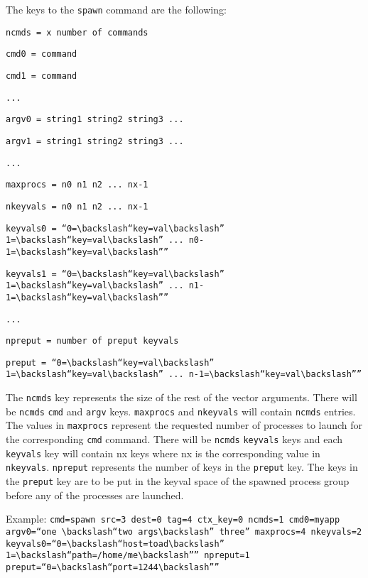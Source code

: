 \documentclass[dvipdfm,11pt]{article}
\begin{document}
The keys to the \texttt{spawn} command are the following:
\begin{description}
\item \texttt{ncmds = x number of commands}
\item \texttt{cmd0 = command}
\item \texttt{cmd1 = command}
\item \texttt{...}
\item \texttt{argv0 = string1 string2 string3 ...}
\item \texttt{argv1 = string1 string2 string3 ...}
\item \texttt{...}
\item \texttt{maxprocs = n0 n1 n2 ... nx-1}
\item \texttt{nkeyvals = n0 n1 n2 ... nx-1}
\item \texttt{keyvals0 = ``0=$\backslash$``key=val$\backslash$'' 
1=$\backslash$``key=val$\backslash$'' ... 
n0-1=$\backslash$``key=val$\backslash$''''}
\item \texttt{keyvals1 = ``0=$\backslash$``key=val$\backslash$'' 
1=$\backslash$``key=val$\backslash$'' ... 
n1-1=$\backslash$``key=val$\backslash$''''}
\item \texttt{...}
\item \texttt{npreput = number of preput keyvals}
\item \texttt{preput = ``0=$\backslash$``key=val$\backslash$'' 
1=$\backslash$``key=val$\backslash$'' ... 
n-1=$\backslash$``key=val$\backslash$''''}
\end{description}

The \texttt{ncmds} key represents the size of the rest of the vector arguments.
There will be \texttt{ncmds} \texttt{cmd} and \texttt{argv} keys.  \texttt{maxprocs}
and \texttt{nkeyvals} will contain \texttt{ncmds} entries.  The values in
\texttt{maxprocs} represent the requested number of processes to launch for the
corresponding \texttt{cmd} command.  There will be \texttt{ncmds} \texttt{keyvals}
keys and each \texttt{keyvals} key will contain nx keys where nx is the 
corresponding value in \texttt{nkeyvals}.  \texttt{npreput} represents the 
number of keys in the \texttt{preput} key.  The keys in the \texttt{preput} key
are to be put in the keyval space of the spawned process group before any
of the processes are launched.

Example: \texttt{cmd=spawn src=3 dest=0 tag=4 ctx\_key=0 ncmds=1 cmd0=myapp
argv0=``one $\backslash$``two args$\backslash$'' three'' maxprocs=4 
nkeyvals=2 keyvals0=``0=$\backslash$``host=toad$\backslash$'' 
1=$\backslash$``path=/home/me$\backslash$'''' 
npreput=1 preput=``0=$\backslash$``port=1244$\backslash$''''}
\end{document}
